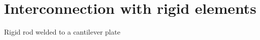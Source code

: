 \documentclass[aspectratio=169]{ISAE-Beamer}
\begin{document}
\section{Interconnection with rigid elements}

\begin{frame}{Rigid rod welded to a cantilever plate }
\begin{tcolorbox}
	\centering
\end{tcolorbox}

\end{frame}
\end{document}

